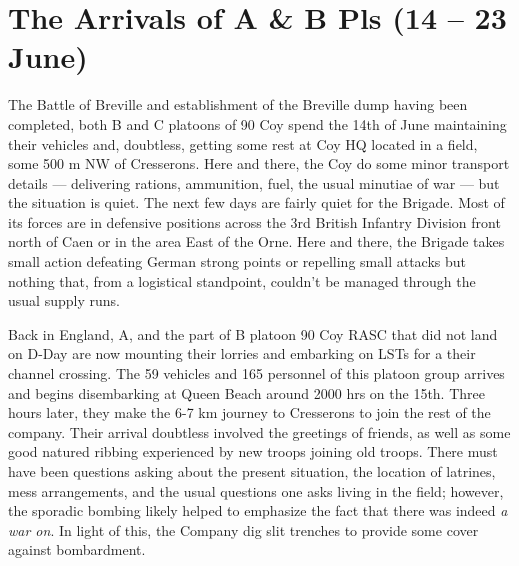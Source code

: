 \documentclass[noraggedright]{turabian-researchpaper}
\begin{document}

\section{The Arrivals of A \& B Pls (14 -- 23 June)}

The Battle of Breville and establishment of the Breville dump having been
completed, both B and C platoons of 90 Coy spend the 14th of June maintaining 
their vehicles and, doubtless, getting some rest at Coy HQ located in a field,
some 500 m NW of Cresserons.  Here and there, the Coy
do some minor transport details --- delivering rations, ammunition, fuel, the
usual minutiae of war --- but the situation is quiet.  The next few days are 
fairly quiet for the Brigade.  Most of its forces are in defensive positions 
across the 3rd British Infantry Division front north of Caen or in the area 
East of the Orne.  Here and there, the Brigade takes small action defeating 
German strong points or repelling small attacks but nothing that, from a 
logistical standpoint, couldn't be managed through the usual supply runs.

Back in England, A, and the part of B platoon 90 Coy RASC that did not land on 
D-Day are now mounting their lorries and embarking on LSTs for a their channel 
crossing.  The 59 vehicles and 165 personnel of this platoon group arrives 
and begins disembarking at Queen Beach around 2000 hrs on the 15th.  Three 
hours later, they make the 6-7 km journey to Cresserons to join the rest of
the company.  Their arrival doubtless involved the greetings of friends, as
well as some good natured ribbing experienced by new troops joining old 
troops.  There must have been questions asking about the present situation,
the location of latrines, mess arrangements, and the usual questions one asks 
living in the field; however, the sporadic bombing likely helped to emphasize
the fact that there was indeed \textit{a war on}.  In light of this, the 
Company dig slit trenches to provide some cover against bombardment.  
\end{document}
